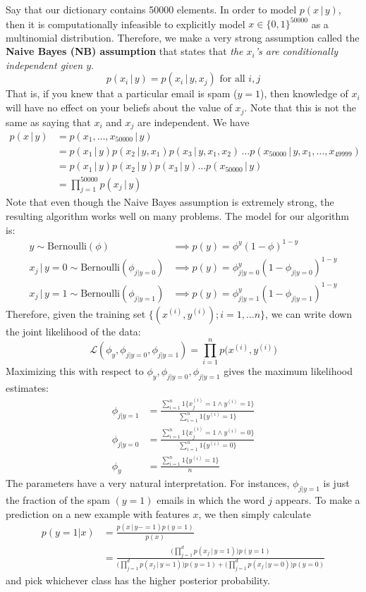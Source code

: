 \documentclass[a4paper, 12pt]{report}
\theoremstyle{remark}
\theoremstyle{definition}
\begin{document}
Say that our dictionary contains 50000 elements. In order to model $p(x\,|\,y)$, then it is computationally infeasible to explicitly model $x \in \{0,1\}^{50000}$ as a multinomial distribution. Therefore, we make a very strong assumption called the \textbf{Naive Bayes (NB) assumption} that states that \textit{the $x_i$'s are conditionally independent given $y$}. 
\[ p(x_i\,|\,y) = p(x_i\,|\,y, x_j) \text{ for all }i, j\]
That is, if you knew that a particular email is spam ($y=1$), then knowledge of $x_{i}$ will have no effect on your beliefs about the value of $x_j$. Note that this is not the same as saying that $x_i$ and $x_j$ are independent. We have
\begin{align*}
    p(x\,|\,y) & = p(x_1, \ldots, x_{50000}\,|\,y) \\
    & = p(x_1\,|\,y) p(x_2\,|\,y, x_1) p(x_3\,|\,y, x_1, x_2)\, \ldots p(x_{50000}\,|\,y, x_1, \ldots, x_{49999}) \\
    & = p(x_1\,|\,y) p(x_2\,|\,y) p(x_3\,|\,y) \ldots p(x_{50000}\,|\,y) \\
    & = \prod_{j=1}^{50000} p(x_j\,|\,y)
\end{align*}
Note that even though the Naive Bayes assumption is extremely strong, the resulting algorithm works well on many problems. The model for our algorithm is: 
\begin{align*}
    y \sim \text{Bernoulli}(\phi) & \implies p(y) = \phi^{y} (1-\phi)^{1-y}\\
    x_j\,|\, y = 0 \sim \text{Bernoulli}(\phi_{j|y=0}) & \implies p(y) = \phi_{j|y=0}^y (1 - \phi_{j|y=0})^{1-y} \\
    x_j\,|\, y = 1 \sim \text{Bernoulli}(\phi_{j|y=1}) & \implies p(y) = \phi_{j|y=1}^y (1 - \phi_{j|y=1})^{1-y}
\end{align*}
Therefore, given the training set $\{(x^{(i)}, y^{(i)}); i = 1, \ldots n\}$, we can write down the joint likelihood of the data: 
\[\mathcal{L}(\phi_y, \phi_{j|y=0}, \phi_{j|y=1}) = \prod_{i=1}^n p\big( x^{(i)}, y^{(i)} \big) \]
Maximizing this with respect to $\phi_y, \phi_{j|y=0}, \phi_{j|y=1}$ gives the maximum likelihood estimates: 
\begin{align*}
    \phi_{j|y=1} & = \frac{\sum_{i=1}^n 1\{ x_j^{(i)} = 1 \wedge y^{(i)} = 1\}}{\sum_{i=1}^n 1\{y^{(i)} = 1\}} \\
    \phi_{j|y=0} & = \frac{\sum_{i=1}^n 1\{ x_j^{(i)} = 1 \wedge y^{(i)} = 0\}}{\sum_{i=1}^n 1\{y^{(i)} = 0\}} \\
    \phi_y & = \frac{\sum_{i=1}^n 1\{y^{(i)} = 1\}}{n}
\end{align*}
The parameters have a very natural interpretation. For instances, $\phi_{j|y=1}$ is just the fraction of the spam $(y=1)$ emails in which the word $j$ appears. To make a prediction on a new example with features $x$, we then simply calculate 
\begin{align*}
    p(y=1|x) & = \frac{p(x\,|\,y-=1) p(y=1)}{p(x)} \\
    & = \frac{\Big( \prod_{j=1}^d p(x_j\,|\,y=1)\Big) p(y=1)}{\Big( \prod_{j=1}^d p(x_j\,|\,y=1)\Big) p(y=1) + \Big( \prod_{j=1}^d p(x_j\,|\,y=0)\Big) p(y=0)}
\end{align*}
and pick whichever class has the higher posterior probability. 
\end{document}

